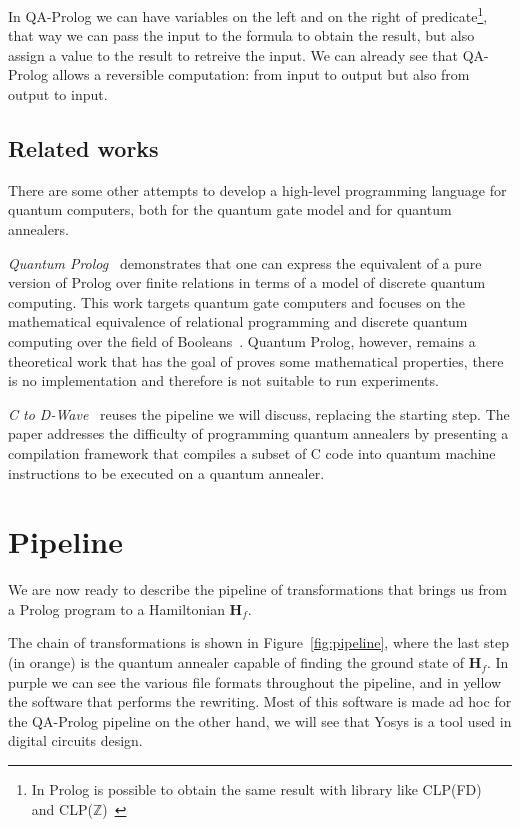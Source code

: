 In QA-Prolog we can have variables on the left and on the right of predicate\footnote{In Prolog is possible to obtain the same result with library like CLP(FD)~\cite{triska2012finite, triska_clpfd_github} and CLP($\mathbb{Z}$)~\cite{triska_clpz_github}}, that way we can pass the input to the formula to obtain the result, but also assign a value to the result to retreive the input. We can already see that QA-Prolog allows a reversible computation: from input to output but also from output to input.

\subsection{Related works}
There are some other attempts to develop a high-level programming language for quantum computers, both for the quantum gate model and for quantum annealers. 

\emph{Quantum Prolog}~\cite{james2011quantum} demonstrates that one can express the equivalent of a pure version of Prolog over finite relations in terms of a model of discrete quantum computing. This work targets quantum gate computers and focuses on the mathematical equivalence of relational programming and discrete quantum computing over the field of Booleans~\cite{pakin2018performing}. Quantum Prolog, however, remains a theoretical work that has the goal of proves some mathematical properties, there is no implementation and therefore is not suitable to run experiments.

\emph{C to D-Wave}~\cite{hassan2019c} reuses the pipeline we will discuss, replacing the starting step. The paper addresses the difficulty of programming quantum annealers by presenting a compilation framework that compiles a subset of C code into quantum machine instructions to be executed on a quantum annealer.


\section{Pipeline}
We are now ready to describe the pipeline of transformations that brings us from a Prolog program to a Hamiltonian $\mathbf{H}_f$.

The chain of transformations is shown in Figure~\ref{fig:pipeline}, where the last step (in orange) is the quantum annealer capable of finding the ground state of $\mathbf{H}_f$. In purple we can see the various file formats throughout the pipeline, and in yellow the software that performs the rewriting. Most of this software is made ad hoc for the QA-Prolog pipeline on the other hand, we will see that Yosys is a tool used in digital circuits design.

